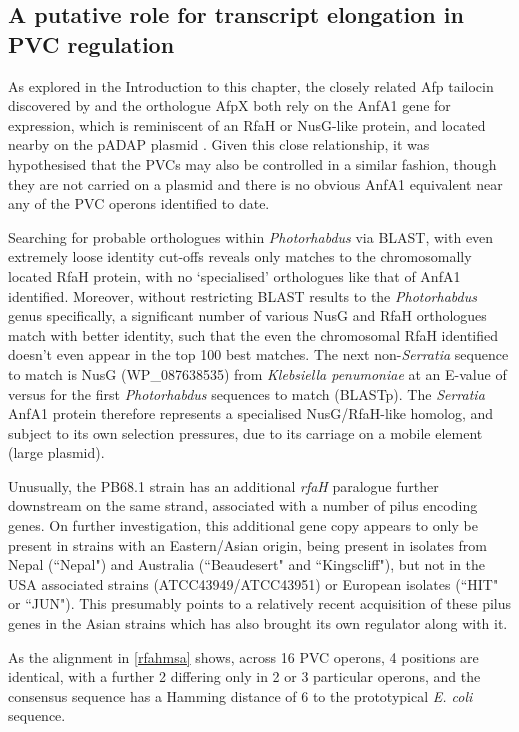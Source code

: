 \subsection{A putative role for transcript elongation in PVC regulation}
As explored in the Introduction to this chapter, the closely related Afp tailocin discovered by \cite{Hurst2004} and the orthologue AfpX \citep{Hurst2018} both rely on the AnfA1 gene for expression, which is reminiscent of an RfaH or NusG-like protein, and located nearby on the pADAP plasmid \citep{Hurst2007a}. Given this close relationship, it was hypothesised that the PVCs may also be controlled in a similar fashion, though they are not carried on a plasmid and there is no obvious AnfA1 equivalent near any of the PVC operons identified to date.

Searching for probable orthologues within \emph{Photorhabdus} via BLAST, with even extremely loose identity cut-offs reveals only matches to the chromosomally located RfaH protein, with no `specialised' orthologues like that of AnfA1 identified. Moreover, without restricting BLAST results to the \emph{Photorhabdus} genus specifically, a significant number of various NusG and RfaH orthologues match with better identity, such that the even the chromosomal RfaH identified doesn't even appear in the top 100 best matches. The next non-\emph{Serratia} sequence to match is NusG (WP\_087638535) from \emph{Klebsiella penumoniae} at an E-value of  versus  for the first \emph{Photorhabdus} sequences to match (BLASTp). The \emph{Serratia} AnfA1 protein therefore represents a specialised NusG/RfaH-like homolog, and subject to its own selection pressures, due to its carriage on a mobile element (large plasmid).

Unusually, the PB68.1 strain has an additional \emph{rfaH} paralogue further downstream on the same strand, associated with a number of pilus encoding genes. On further investigation, this additional gene copy appears to only be present in \Pasy{} strains with an Eastern/Asian origin, being present in isolates from Nepal (``Nepal") and Australia (``Beaudesert" and ``Kingscliff"), but not in the USA associated strains (ATCC43949/ATCC43951) or European isolates (``HIT" or ``JUN"). This presumably points to a relatively recent acquisition of these pilus genes in the Asian strains which has also brought its own regulator along with it.

As the alignment in \vref{rfahmsa} shows, across 16 PVC operons, 4 positions are identical, with a further 2 differing only in 2 or 3 particular operons, and the consensus sequence has a Hamming distance of 6 to the prototypical \emph{E. coli} sequence.

